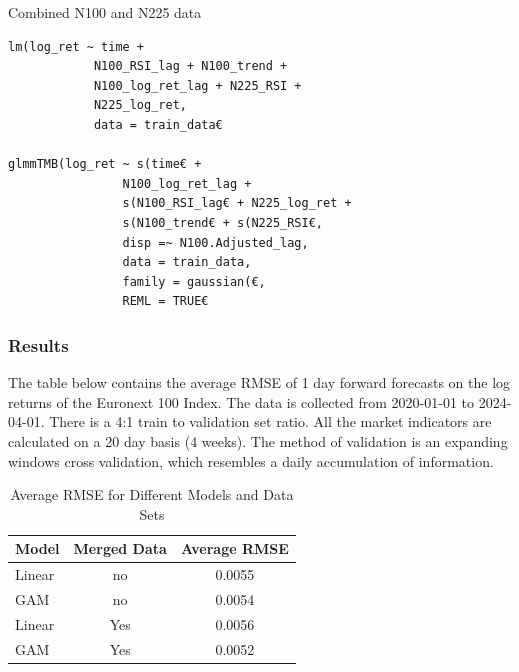 \documentclass[12pt, twoside,hidelinks]{article}
\theoremstyle{definition}
\numberwithin{equation}{section}
\begin{document}
Combined N100 and N225 data

\begin{lstlisting}
lm(log_ret ~ time + 
            N100_RSI_lag + N100_trend +
            N100_log_ret_lag + N225_RSI +
            N225_log_ret,
            data = train_data€

glmmTMB(log_ret ~ s(time€ +
                N100_log_ret_lag + 
                s(N100_RSI_lag€ + N225_log_ret +
                s(N100_trend€ + s(N225_RSI€,
                disp =~ N100.Adjusted_lag,
                data = train_data,
                family = gaussian(€, 
                REML = TRUE€
\end{lstlisting}


\subsubsection{Results}

The table below contains the average RMSE of 1 day forward forecasts on the log returns of the Euronext 100 Index. The data is collected from 2020-01-01 to 2024-04-01. There is a 4:1 train to validation set ratio. All the market indicators are calculated on a 20 day basis (4 weeks). The method of validation is an expanding windows cross validation, which resembles a daily accumulation of information.

\begin{table}[H]
\centering
\caption{Average RMSE for Different Models and Data Sets}
\label{tab:rmse_comparison}
\begin{tabular}{@{}lcc@{}}
\toprule
Model & Merged Data & Average RMSE \\ 
\midrule
Linear & no & 0.0055 \\ 
GAM & no &  0.0054 \\ 
Linear & Yes & 0.0056 \\ 
GAM & Yes & 0.0052 \\ 
\bottomrule
\end{tabular}
\end{table}
\end{document}
